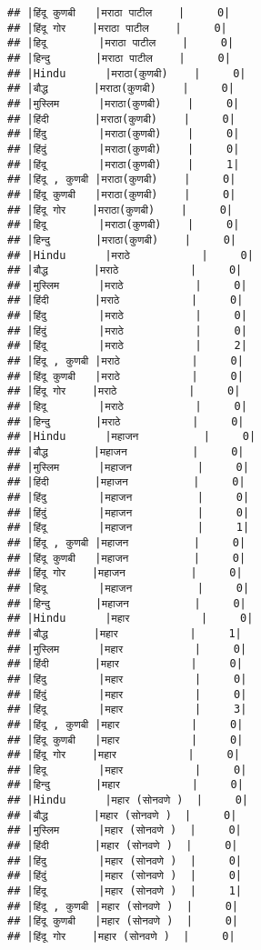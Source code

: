 \documentclass[
]{article}
\begin{document}
\begin{verbatim}
## |हिंदू कुणबी   |मराठा पाटील    |     0|
## |हिंदू गोर    |मराठा पाटील    |     0|
## |हिदू        |मराठा पाटील    |     0|
## |हिन्दु       |मराठा पाटील    |     0|
## |Hindu      |मराठा(कुणबी)    |     0|
## |बौद्ध       |मराठा(कुणबी)    |     0|
## |मुस्लिम      |मराठा(कुणबी)    |     0|
## |हिंदी       |मराठा(कुणबी)    |     0|
## |हिंदु        |मराठा(कुणबी)    |     0|
## |हिंदुं        |मराठा(कुणबी)    |     0|
## |हिंदू        |मराठा(कुणबी)    |     1|
## |हिंदू , कुणबी |मराठा(कुणबी)    |     0|
## |हिंदू कुणबी   |मराठा(कुणबी)    |     0|
## |हिंदू गोर    |मराठा(कुणबी)    |     0|
## |हिदू        |मराठा(कुणबी)    |     0|
## |हिन्दु       |मराठा(कुणबी)    |     0|
## |Hindu      |मराठे           |     0|
## |बौद्ध       |मराठे           |     0|
## |मुस्लिम      |मराठे           |     0|
## |हिंदी       |मराठे           |     0|
## |हिंदु        |मराठे           |     0|
## |हिंदुं        |मराठे           |     0|
## |हिंदू        |मराठे           |     2|
## |हिंदू , कुणबी |मराठे           |     0|
## |हिंदू कुणबी   |मराठे           |     0|
## |हिंदू गोर    |मराठे           |     0|
## |हिदू        |मराठे           |     0|
## |हिन्दु       |मराठे           |     0|
## |Hindu      |महाजन          |     0|
## |बौद्ध       |महाजन          |     0|
## |मुस्लिम      |महाजन          |     0|
## |हिंदी       |महाजन          |     0|
## |हिंदु        |महाजन          |     0|
## |हिंदुं        |महाजन          |     0|
## |हिंदू        |महाजन          |     1|
## |हिंदू , कुणबी |महाजन          |     0|
## |हिंदू कुणबी   |महाजन          |     0|
## |हिंदू गोर    |महाजन          |     0|
## |हिदू        |महाजन          |     0|
## |हिन्दु       |महाजन          |     0|
## |Hindu      |महार           |     0|
## |बौद्ध       |महार           |     1|
## |मुस्लिम      |महार           |     0|
## |हिंदी       |महार           |     0|
## |हिंदु        |महार           |     0|
## |हिंदुं        |महार           |     0|
## |हिंदू        |महार           |     3|
## |हिंदू , कुणबी |महार           |     0|
## |हिंदू कुणबी   |महार           |     0|
## |हिंदू गोर    |महार           |     0|
## |हिदू        |महार           |     0|
## |हिन्दु       |महार           |     0|
## |Hindu      |महार (सोनवणे )  |     0|
## |बौद्ध       |महार (सोनवणे )  |     0|
## |मुस्लिम      |महार (सोनवणे )  |     0|
## |हिंदी       |महार (सोनवणे )  |     0|
## |हिंदु        |महार (सोनवणे )  |     0|
## |हिंदुं        |महार (सोनवणे )  |     0|
## |हिंदू        |महार (सोनवणे )  |     1|
## |हिंदू , कुणबी |महार (सोनवणे )  |     0|
## |हिंदू कुणबी   |महार (सोनवणे )  |     0|
## |हिंदू गोर    |महार (सोनवणे )  |     0|

\end{verbatim}
\end{document}
